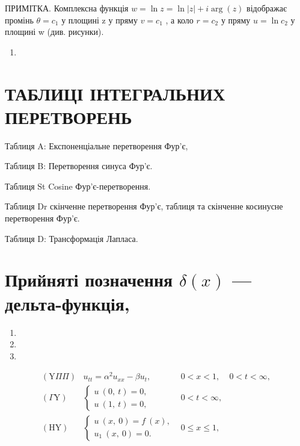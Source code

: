 \documentclass[
  ukrainian,
]{article}
\providecommand{\tightlist}{%
  \setlength{\itemsep}{0pt}\setlength{\parskip}{0pt}}
\begin{document}
ПРИМІТКА. Комплексна функція \(w = \ln z = \ln |z| + i \arg(z)\)
відображає промінь \(\theta = c_1\) у площині z у пряму \(v = c_1\) , а
коло \(r = c_2\) у пряму \(u = \ln c_2\) у площині w (див. рисунки).

\begin{enumerate}
\def\labelenumi{\arabic{enumi}.}
\setcounter{enumi}{10}
\tightlist
\item
\end{enumerate}

\section{ТАБЛИЦІ ІНТЕГРАЛЬНИХ
ПЕРЕТВОРЕНЬ}\label{ux442ux430ux431ux43bux438ux446ux456-ux456ux43dux442ux435ux433ux440ux430ux43bux44cux43dux438ux445-ux43fux435ux440ux435ux442ux432ux43eux440ux435ux43dux44c}

Таблиця A: Експоненціальне перетворення Фур'є,

Таблиця B: Перетворення синуса Фур'є.

Таблиця St Cosine Фур'є-перетворення.

Таблиця Dr скінченне перетворення Фур'є, таблиця та скінченне косинусне
перетворення Фур'є.

Таблиця D: Трансформація Лапласа.

\section{\texorpdfstring{Прийняті позначення \(\delta\left(x\right)\)
---
дельта-функція,}{Прийняті позначення \textbackslash delta\textbackslash left(x\textbackslash right) --- дельта-функція,}}\label{ux43fux440ux438ux439ux43dux44fux442ux456-ux43fux43eux437ux43dux430ux447ux435ux43dux43dux44f-deltaleftxright-ux434ux435ux43bux44cux442ux430-ux444ux443ux43dux43aux446ux456ux44f}

\begin{enumerate}
\def\labelenumi{\arabic{enumi}.}
\setcounter{enumi}{11}
\tightlist
\item
\item
\item
\end{enumerate}

\[
\begin{array}{lll} (\mathrm{Y} \Pi \Pi) & u_{tt} = \alpha^2 u_{xx} - \beta u_t, & 0 < x < 1, & 0 < t < \infty, \\ (\Gamma \mathrm{Y}) & \begin{cases} u \ (0, \ t) = 0, \\ u \ (1, \ t) = 0, \end{cases} & 0 < t < \infty, \\ (\mathrm{H} \mathrm{Y}) & \begin{cases} u \ (x, \ 0) = f \ (x), \\ u_1 \ (x, \ 0) = 0. \end{cases} & 0 \leqslant x \leqslant 1, \end{array}
\]
\end{document}
